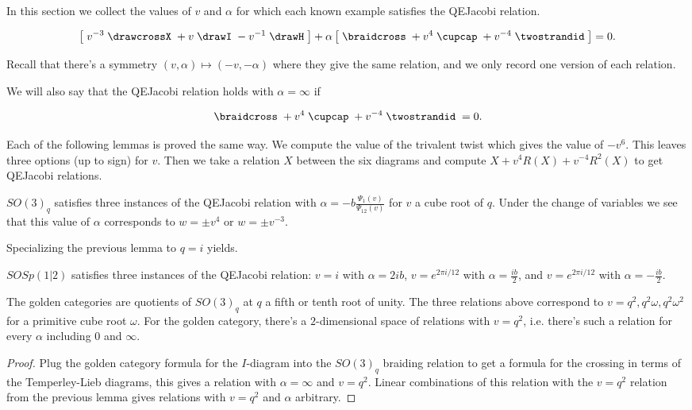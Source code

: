 \documentclass[12pt]{amsart}
\begin{document}
In this section we collect the values of $v$ and $\alpha$ for which each known example satisfies the QEJacobi relation.  

\begin{equation*}
\left[\; v^{-3} \;
\drawcrossX
\;+ v \;
\drawI
\; -v^{-1} \;
 \drawH
\;\right]
 + \alpha
\left[\; \braidcross \;
 + v^{4}\;
\cupcap
\; + v^{-4} \;
 \twostrandid \;
 \right] = 0.
 \end{equation*}
 
Recall that there's a symmetry $(v,\alpha) \mapsto (-v,-\alpha)$ where they give the same relation, and we only record one version of each relation.

We will also say that the QEJacobi relation holds with $\alpha=\infty$ if

\begin{equation*}
\braidcross \;
 + v^{4}\;
\cupcap
\; + v^{-4} \;
 \twostrandid \;= 0.
 \end{equation*}

Each of the following lemmas is proved the same way.  We compute the value of the trivalent twist which gives the value of $-v^6$.  This leaves three options (up to sign) for $v$.  Then we take a relation $X$ between the six diagrams and compute $X+v^{4} R(X)+ v^{-4}R^2(X)$ to get QEJacobi relations. 

\begin{lemma}
$SO(3)_q$ satisfies three instances of the QEJacobi relation with $\alpha = -b \frac{\Psi_1(v)}{\Psi_{12}(v)} $ for $v$ a cube root of $q$.  Under the change of variables we see that this value of $\alpha$ corresponds to $w = \pm v^4$ or $w = \pm v^{-3}$.
\end{lemma}


Specializing the previous lemma to $q=i$ yields.

\begin{lemma}
$SOSp(1|2)$ satisfies three instances of the QEJacobi relation: $v=i$ with $\alpha = 2 i b$, $v = e^{2 \pi i/12}$ with $\alpha = \frac{i b}{2}$, and $v=e^{2 \pi i/12}$ with $\alpha = -\frac{i b}{2}$.
\end{lemma}

\begin{lemma}
The golden categories are quotients of $SO(3)_q$ at $q$ a fifth or tenth root of unity.  The three relations above correspond to $v = q^2, q^2 \omega, q^2 \omega^2$ for a primitive cube root $\omega$.  For the golden category, there's a $2$-dimensional space of relations with $v = q^2$, i.e. there's such a relation for every $\alpha$ including $0$ and $\infty$.
 \end{lemma}
 \begin{proof}
Plug the golden category formula for the $I$-diagram into the $SO(3)_q$ braiding relation to get a formula for the crossing in terms of the Temperley-Lieb diagrams, this gives a relation with $\alpha=\infty$ and $v=q^2$.  Linear combinations of this relation with the $v = q^2$ relation from the previous lemma gives relations with $v = q^2$ and $\alpha$ arbitrary.
 \end{proof}
\end{document}

